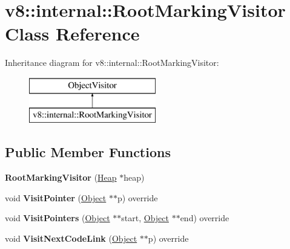 \hypertarget{classv8_1_1internal_1_1_root_marking_visitor}{}\section{v8\+:\+:internal\+:\+:Root\+Marking\+Visitor Class Reference}
\label{classv8_1_1internal_1_1_root_marking_visitor}
Inheritance diagram for v8\+:\+:internal\+:\+:Root\+Marking\+Visitor\+:\begin{figure}[H]
\begin{center}
\leavevmode
\includegraphics[height=2.000000cm]{classv8_1_1internal_1_1_root_marking_visitor}
\end{center}
\end{figure}
\subsection*{Public Member Functions}
\begin{DoxyCompactItemize}
\item 
{\bfseries Root\+Marking\+Visitor} (\hyperlink{classv8_1_1internal_1_1_heap}{Heap} $\ast$heap)\hypertarget{classv8_1_1internal_1_1_root_marking_visitor_a087e55ec72f4f3a033cd9b7ab959ed3f}{}\label{classv8_1_1internal_1_1_root_marking_visitor_a087e55ec72f4f3a033cd9b7ab959ed3f}

\item 
void {\bfseries Visit\+Pointer} (\hyperlink{classv8_1_1internal_1_1_object}{Object} $\ast$$\ast$p) override\hypertarget{classv8_1_1internal_1_1_root_marking_visitor_acd819b7cd7e07cb5a90b1d3b2e2c951b}{}\label{classv8_1_1internal_1_1_root_marking_visitor_acd819b7cd7e07cb5a90b1d3b2e2c951b}

\item 
void {\bfseries Visit\+Pointers} (\hyperlink{classv8_1_1internal_1_1_object}{Object} $\ast$$\ast$start, \hyperlink{classv8_1_1internal_1_1_object}{Object} $\ast$$\ast$end) override\hypertarget{classv8_1_1internal_1_1_root_marking_visitor_aa5a9330def693e25d2294a493938c45e}{}\label{classv8_1_1internal_1_1_root_marking_visitor_aa5a9330def693e25d2294a493938c45e}

\item 
void {\bfseries Visit\+Next\+Code\+Link} (\hyperlink{classv8_1_1internal_1_1_object}{Object} $\ast$$\ast$p) override\hypertarget{classv8_1_1internal_1_1_root_marking_visitor_a5374607c8c2613dc8074a6d75fe97f48}{}\label{classv8_1_1internal_1_1_root_marking_visitor_a5374607c8c2613dc8074a6d75fe97f48}

\end{DoxyCompactItemize}
